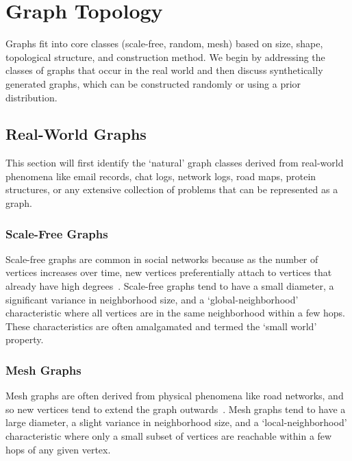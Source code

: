 \section{Graph Topology}
\label{section:22-graph-topology}
Graphs fit into core classes (scale-free, random, mesh) based on size, shape, topological structure, and construction method. 
We begin by addressing the classes of graphs that occur in the real world and then discuss synthetically generated graphs, which can be constructed randomly or using a prior distribution.

\subsection{Real-World Graphs}
This section will first identify the `natural' graph classes derived from real-world phenomena like email records, chat logs, network logs, road maps, protein structures, or any extensive collection of problems that can be represented as a graph.

\subsubsection{Scale-Free Graphs}

Scale-free graphs are common in social networks because as the number of vertices increases over time, new vertices preferentially attach to vertices that already have high degrees~\cite{Barabasi1999a}. 
Scale-free graphs tend to have a small diameter, a significant variance in neighborhood size, and a `global-neighborhood' characteristic where all vertices are in the same neighborhood within a few hops.
These characteristics are often amalgamated and termed the `small world' property.

\subsubsection{Mesh Graphs}

Mesh graphs are often derived from physical phenomena like road networks, and so new vertices tend to extend the graph outwards~\cite{Beamer2015}.
Mesh graphs tend to have a large diameter, a slight variance in neighborhood size, and a `local-neighborhood' characteristic where only a small subset of vertices are reachable within a few hops of any given vertex.

